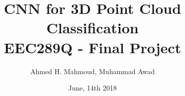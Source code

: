 \documentclass[12pt]{article}
\begin{document}
\title{CNN for 3D Point Cloud Classification\\
EEC289Q - Final Project}
\author{Ahmed H. Mahmoud, Muhammad Awad}
\date{June, 14th 2018} 

\maketitle













\end{document}
